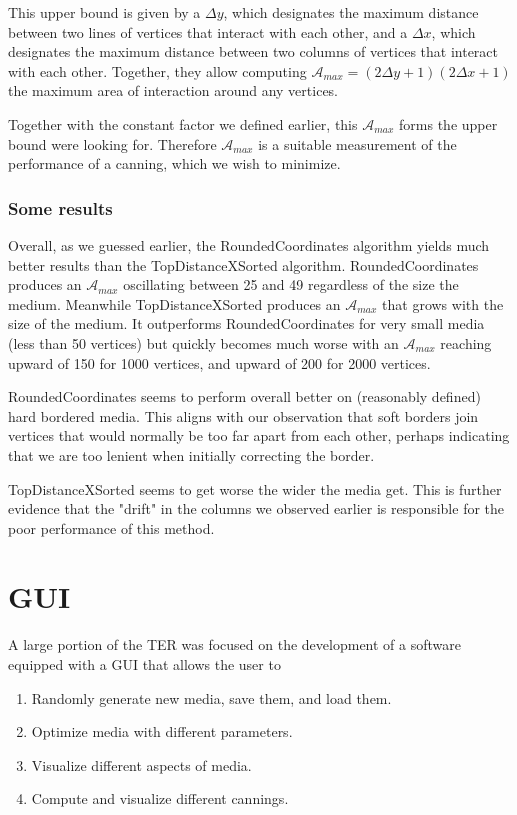 \documentclass{article}
\begin{document}
This upper bound is given by a $\Delta y$, which designates the maximum distance between two lines of vertices that interact with each other, and a $\Delta x$, which designates the maximum distance between two columns of vertices that interact with each other. Together, they allow computing $\mathcal{A}_{max} = (2\Delta y + 1)(2\Delta x + 1)$ the maximum area of interaction around any vertices.

Together with the constant factor we defined earlier, this $\mathcal{A}_{max}$ forms the upper bound were looking for. Therefore $\mathcal{A}_{max}$ is a suitable measurement of the performance of a canning, which we wish to minimize.

\subsubsection{Some results}

Overall, as we guessed earlier, the RoundedCoordinates algorithm yields much better results than the TopDistanceXSorted algorithm. RoundedCoordinates produces an $\mathcal{A}_{max}$ oscillating between 25 and 49 regardless of the size the medium. Meanwhile TopDistanceXSorted produces an $\mathcal{A}_{max}$ that grows with the size of the medium. It outperforms RoundedCoordinates for very small media (less than 50 vertices) but quickly becomes much worse with an $\mathcal{A}_{max}$ reaching upward of 150 for 1000 vertices, and upward of 200 for 2000 vertices.

RoundedCoordinates seems to perform overall better on (reasonably defined) hard bordered media. This aligns with our observation that soft borders join vertices that would normally be too far apart from each other, perhaps indicating that we are too lenient when initially correcting the border.

TopDistanceXSorted seems to get worse the wider the media get. This is further evidence that the "drift" in the columns we observed earlier is responsible for the poor performance of this method.

\section{GUI}

A large portion of the TER was focused on the development of a software equipped with a GUI that allows the user to
\begin{enumerate}
	\item Randomly generate new media, save them, and load them.
	\item Optimize media with different parameters.
	\item Visualize different aspects of media.
	\item Compute and visualize different cannings.
\end{enumerate}
$ $
\end{document}
